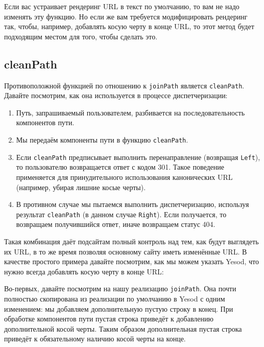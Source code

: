Если вас устраивает рендеринг URL в текст по умолчанию, то вам не надо изменять
эту функцию. Но если же вам требуется модифицировать рендеринг так, чтобы,
например, добавлять косую черту в конце URL, то этот метод будет подходящим
местом для того, чтобы сделать это.

\subsection{cleanPath}

Противоположной функцией по отношению к \lstinline!joinPath! является
\lstinline!cleanPath!. Давайте посмотрим, как она используется в процессе
диспетчеризации:

\begin{enumerate}
  \item Путь, запрашиваемый пользователем, разбивается на последовательность
      компонентов пути.

  \item Мы передаём компоненты пути в функцию \lstinline!cleanPath!.

  \item Если \lstinline!cleanPath! предписывает выполнить перенаправление
      (возвращая \lstinline!Left!), то пользователю возвращается ответ с кодом
      301. Такое поведение применяется для принудительного использования
      канонических URL (например, убирая лишние косые черты).

  \item В противном случае мы пытаемся выполнить диспетчеризацию, используя
      результат \lstinline!cleanPath! (в данном случае \lstinline!Right!). Если
      получается, то возвращаем получившийся ответ, иначе возвращаем статус
      404.
\end{enumerate}

Такая комбинация даёт подсайтам полный контроль над тем, как будут выглядеть их
URL, в то же время позволяя основному сайту иметь изменённые URL. В качестве
простого примера давайте посмотрим, как мы можем указать Yesod, что нужно
всегда добавлять косую черту в конце URL:

Во-первых, давайте посмотрим на нашу реализацию \lstinline!joinPath!. Она почти
полностью скопирована из реализации по умолчанию в Yesod с одним изменением: мы
добавляем дополнительную пустую строку в конец. При обработке компонентов пути
пустая строка приведёт к добавлению дополнительной косой черты. Таким образом
дополнительная пустая строка приведёт к обязательному наличию косой черты на
конце.

